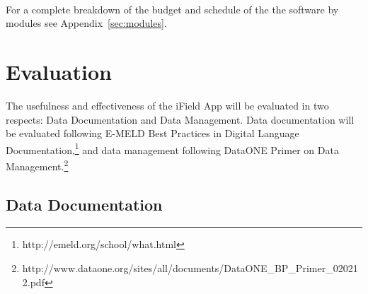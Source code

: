 \documentclass[12 pt]{article}
\begin{document}
~\\
For a complete breakdown of the budget and schedule of the the software by modules see Appendix~\ref{sec:modules}.





\normalsize




\section {Evaluation}



The usefulness and effectiveness of the iField App will be evaluated in two respects: Data Documentation and Data Management. Data documentation will be evaluated following E-MELD Best Practices in Digital Language Documentation,\footnote{http://emeld.org/school/what.html} and data management following DataONE Primer on Data Management.\footnote{http://www.dataone.org/sites/all/documents/DataONE\_BP\_Primer\_020212.pdf}



\subsection {Data Documentation }
\end{document}
